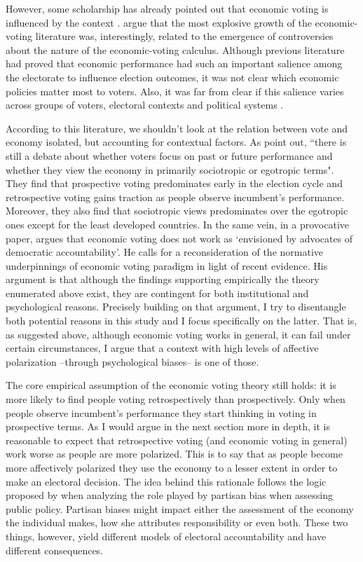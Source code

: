 \documentclass[a4paper, svgnames]{article}
\begin{document}
However, some scholarship has already pointed out that economic voting is influenced by the context \citep{Dorussen2002, Anderson2007, Singer2015}. \cite{Dorussen2002} argue that the most explosive growth of the economic-voting literature was, interestingly, related to the emergence of controversies about the nature of the economic-voting calculus. Although previous literature had proved that economic performance had such an important salience among the electorate to influence election outcomes, it was not clear which economic policies matter most to voters. Also, it was far from clear if this salience varies across groups of voters, electoral contexts and political systems \citep{Dorussen2002}.

According to this literature, we shouldn't look at the relation between vote and economy isolated, but accounting for contextual factors. As \citet[p. 1]{Singer2015} point out, ``there is still a debate about whether voters focus on past or future performance and whether they view the economy in primarily sociotropic or egotropic terms". They find that prospective voting predominates early in the election cycle and retrospective voting gains traction as people observe incumbent's performance. Moreover, they also find that sociotropic views predominates over the egotropic ones except for the least developed countries. In the same vein, in a provocative paper, \cite[p. 1]{Anderson2007} argues that economic voting does not work as `envisioned by advocates of democratic accountability'. He  calls for a reconsideration of the normative underpinnings of economic voting paradigm in light of recent evidence. His argument is that although the findings supporting empirically the theory enumerated above exist, they are contingent for both institutional and psychological reasons. Precisely building on that argument, I try to disentangle both potential reasons in this study and I focus specifically on the latter. That is, as suggested above, although economic voting works in general, it can fail under certain circumstances, I argue that a context with high levels of affective polarization --through psychological biases-- is one of those.

The core empirical assumption of the economic voting theory still holds: it is more likely to find people voting retrospectively than prospectively. Only when people observe incumbent's performance they start thinking in voting in prospective terms. As I would argue in the next section more in depth, it is reasonable to expect that retrospective voting (and economic voting in general) work worse as people are more polarized. This is to say that as people become more affectively polarized they use the economy to a lesser extent in order to make an electoral decision. The idea behind this rationale follows the logic proposed by \citet*{tilleyGovernmentBlameExperimental2011a} when analyzing the role played by partisan bias when assessing public policy. Partisan biases might impact either the assessment of the economy the individual makes, how she attributes responsibility or even both. These two things, however, yield different models of electoral accountability and have different consequences.
\end{document}
